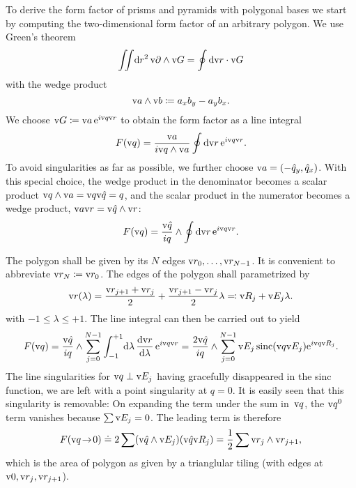 To derive the form factor of prisms and pyramids with polygonal bases
we start by computing the two-dimensional form factor of an arbitrary polygon.
We use Green's theorem
\begin{equation}
  \iint\!\text{d} r^2\,\text{v}{\partial}\wedge\text{v}{G} = \oint \text{d}\text{v}{r}\cdot\text{v}{G}
\end{equation}
with the wedge product
\begin{equation}
  \text{v}{a}\wedge\text{v}{b} \coloneqq
  a_xb_y - a_yb_x.
\end{equation}
We choose $\text{v}{G}\coloneqq\text{v}{a}\, \text{e}^{i\text{v}{q}\text{v}{r}}$
to obtain the form factor as a line integral
\begin{equation}
  F(\text{v}{q})=\frac{\text{v}{a}}{i \text{v}{q}\wedge\text{v}{a}} \oint \text{d}\text{v}{r}\,\text{e}^{i\text{v}{q}\text{v}{r}}.
\end{equation}
To avoid singularities as far as possible,
we further choose $\text{v}{a}=(-\hat q_y,\hat q_x)$.
With this special choice,
the wedge product in the denominator becomes a scalar product
$\text{v}{q}\wedge\text{v}{a}=\text{v}{q}\text{v}{\hat q}=q$, and
the scalar product in the numerator becomes a wedge product,
$\text{v}{a}\text{v}{r}=\text{v}{\hat q}\wedge\text{v}{r}$:
\begin{equation}
  F(\text{v}{q})=\frac{\text{v}{\hat q}}{iq}\wedge \oint \text{d}\text{v}{r}\,\text{e}^{i\text{v}{q}\text{v}{r}}.
\end{equation}

The polygon shall be given by its $N$ edges $\text{v}{r}_0,\ldots,\text{v}{r}_{N-1}$.
It is convenient to abbreviate $\text{v}{r}_N\coloneqq\text{v}{r}_0$.
The edges of the polygon shall parametrized by
\begin{equation}
  \text{v}{r}(\lambda) = \frac{\text{v}{r}_{j+1}+\text{v}{r}_j}{2} + \frac{\text{v}{r}_{j+1}-\text{v}{r}_j}{2} \lambda
  \eqqcolon \text{v}{R}_j + \text{v}{E}_j\lambda.
\end{equation}
with $-1\le\lambda\le+1$.
The line integral can then be carried out to yield
\begin{equation}\label{Effpolygon}
    F(\text{v}{q}) = \displaystyle \frac{\text{v}{\hat q}}{iq}\wedge \sum_{j=0}^{N-1}
              \int_{-1}^{+1}\!\text{d}\lambda\, \frac{\text{d}\text{v}{r}}{\text{d}\lambda}\,\text{e}^{i\text{v}{q}\text{v}{r}}
          = \displaystyle \frac{2\text{v}{\hat q}}{iq}\wedge \sum_{j=0}^{N-1}
              \text{v}{E}_j \operatorname{sinc}(\text{v}{q}\text{v}{E}_j) \text{e}^{i\text{v}{q}\text{v}{R}_j}.
\end{equation}
The line singularities for $\text{v}{q}\perp\text{v}{E}_j$ having gracefully disappeared in the
sinc function,
we are left with a point singularity at $q=0$.
It is easily seen that this singularity is removable:
On expanding the term under the sum in~$\text{v}{q}$,
the $\text{v}{q}^0$ term vanishes because $\sum\text{v}{E}_j=0$.
The leading term is therefore
\begin{equation}
  F(\text{v}{q}\!\to\!0) \doteq 2\sum (\text{v}{\hat q}\wedge\text{v}{E}_j) (\text{v}{\hat q}\text{v}{R}_j)
    = \frac{1}{2}\sum \text{v}{r}_j\wedge\text{v}{r}_{j+1},
\end{equation}
which is the area of polygon
as given by a trianglular tiling (with edges at $\text{v}{0},\text{v}{r}_j,\text{v}{r}_{j+1}$).

